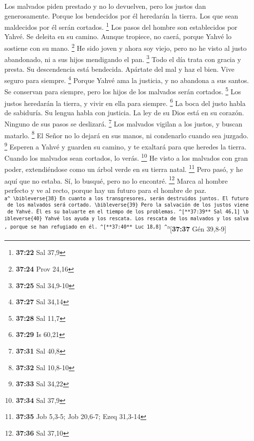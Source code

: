 \begin{paracol}{2}
 Los malvados piden prestado y no lo devuelven, pero los
justos dan generosamente.  Porque los bendecidos por él
heredarán la tierra. Los que sean maldecidos por él serán cortados.
\footnote{\textbf{37:22} Sal 37,9}  Los pasos del hombre
son establecidos por Yahvé. Se deleita en su camino. 
Aunque tropiece, no caerá, porque Yahvé lo sostiene con su mano.
\footnote{\textbf{37:24} Prov 24,16}  He sido joven y
ahora soy viejo, pero no he visto al justo abandonado, ni a sus hijos
mendigando el pan. \footnote{\textbf{37:25} Sal 34,9-10} 
Todo el día trata con gracia y presta. Su descendencia está bendecida.
 Apártate del mal y haz el bien. Vive seguro para
siempre. \footnote{\textbf{37:27} Sal 34,14}  Porque
Yahvé ama la justicia, y no abandona a sus santos. Se conservan para
siempre, pero los hijos de los malvados serán cortados. \footnote{\textbf{37:28}
  Sal 11,7}  Los justos heredarán la tierra, y vivir en
ella para siempre. \footnote{\textbf{37:29} Is 60,21}  La
boca del justo habla de sabiduría. Su lengua habla con justicia.
 La ley de su Dios está en su corazón. Ninguno de sus
pasos se deslizará. \footnote{\textbf{37:31} Sal 40,8} 
Los malvados vigilan a los justos, y buscan matarlo. \footnote{\textbf{37:32}
  Sal 10,8-10}  El Señor no lo dejará en sus manos, ni
condenarlo cuando sea juzgado. \footnote{\textbf{37:33} Sal 34,22}
 Esperen a Yahvé y guarden su camino, y te exaltará para
que heredes la tierra. Cuando los malvados sean cortados, lo verás.
\footnote{\textbf{37:34} Sal 37,9}  He visto a los
malvados con gran poder, extendiéndose como un árbol verde en su tierra
natal. \footnote{\textbf{37:35} Job 5,3-5; Job 20,6-7; Ezeq 31,3-14}
 Pero pasó, y he aquí que no estaba. Sí, lo busqué, pero
no lo encontré. \footnote{\textbf{37:36} Sal 37,10} 
Marca al hombre perfecto y ve al recto, porque hay un futuro para el
hombre de paz.
\textsuperscript{\texttt{a\^{}\ \textbackslash{}bibleverse\{38\}\ En\ cuanto\ a\ los\ transgresores,\ serán\ destruidos\ juntos.\ El\ futuro\ de\ los\ malvados\ será\ cortado.\ \textbackslash{}bibleverse\{39\}\ Pero\ la\ salvación\ de\ los\ justos\ viene\ de\ Yahvé.\ Él\ es\ su\ baluarte\ en\ el\ tiempo\ de\ los\ problemas.\ \^{}{[}**37:39**\ Sal\ 46,1{]}\ \textbackslash{}bibleverse\{40\}\ Yahvé\ los\ ayuda\ y\ los\ rescata.\ Los\ rescata\ de\ los\ malvados\ y\ los\ salva,\ porque\ se\ han\ refugiado\ en\ él.\ \^{}{[}**37:40**\ Luc\ 18,8{]}\ \^{}}a}{[}\textbf{37:37}
Gén 39,8-9{]} \switchcolumn \begin{otherlanguage}{english}


\end{otherlanguage}
\end{paracol}
